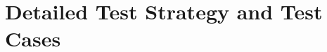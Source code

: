 \documentclass[report.tex]{subfiles}
\begin{document}
\chapter{Detailed Test Strategy and Test Cases} %
\label{cha:detailed_test_strategy_and_test_cases}

\newpage
\end{document}
